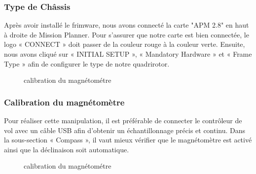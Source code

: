 	\subsubsection{Type de Châssis}
	Après avoir installé le frimware, nous avons connecté  la carte "APM 2.8" en haut à droite de Mission Planner. Pour s'assurer que notre carte est bien connectée, le logo « CONNECT » doit passer de la couleur rouge à la couleur verte. Ensuite, nous avons cliqué sur « INITIAL SETUP », « Mandatory Hardware » et « Frame Type » afin de configurer le type de notre quadrirotor. 
	\begin{figure}[H]
		\begin{center}
			\centering
		\end{center}
		\caption{calibration du magnétométre}
	\end{figure}
	\subsubsection{Calibration du magnétomètre}
	Pour réaliser cette manipulation, il est préférable de connecter le contrôleur de vol avec un câble USB afin d'obtenir un échantillonnage précis et continu.
	Dans la sous-section « Compass », il vaut mieux vérifier que le magnétomètre est activé ainsi que la déclinaison soit automatique.
	
	\begin{figure}[H]
		\begin{center}
			\centering
		\end{center}
		\caption{calibration du magnétométre}
	\end{figure}
	
